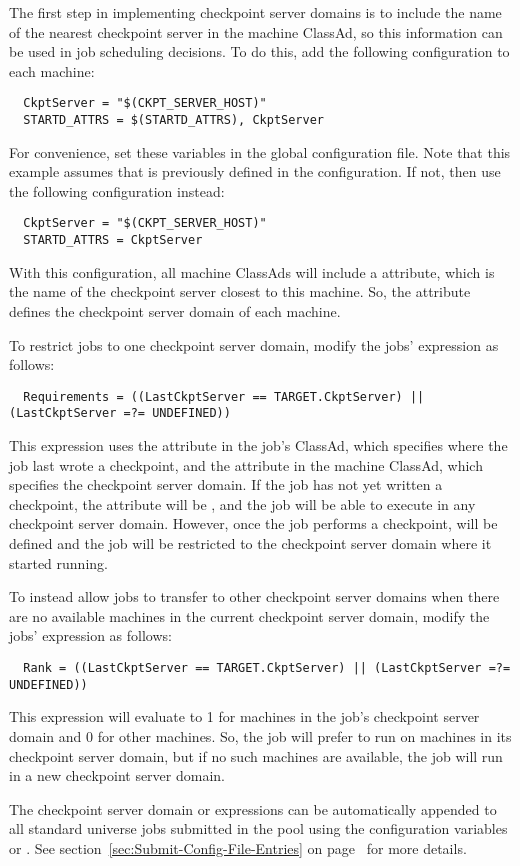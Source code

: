 The first step in implementing checkpoint server domains is to include
the name of the nearest checkpoint server in the machine
ClassAd, so this information can be used in job scheduling decisions.
To do this, add the following configuration to each machine:
\begin{verbatim}
  CkptServer = "$(CKPT_SERVER_HOST)"
  STARTD_ATTRS = $(STARTD_ATTRS), CkptServer
\end{verbatim}
For convenience, set these variables in the global configuration file.
Note that this example assumes that
 is previously defined in the configuration.
If not, then use the following configuration instead:
\begin{verbatim}
  CkptServer = "$(CKPT_SERVER_HOST)"
  STARTD_ATTRS = CkptServer
\end{verbatim}
With this configuration, all machine ClassAds will include a 
attribute, which is the name of the checkpoint server closest to this
machine.  So, the  attribute defines the checkpoint
server domain of each machine.

To restrict jobs to one checkpoint server domain,
modify the jobs'  expression as follows:
\footnotesize
\begin{verbatim}
  Requirements = ((LastCkptServer == TARGET.CkptServer) || (LastCkptServer =?= UNDEFINED))
\end{verbatim}
\normalsize
This  expression uses the 
attribute in the job's ClassAd, which specifies where the job last
wrote a checkpoint, and the  attribute in the
machine ClassAd, which specifies the checkpoint server domain.  If the
job has not yet written a checkpoint, the 
attribute will be , and the job will be able to execute in
any checkpoint server domain.  However, once the job performs a
checkpoint,
 will be defined and the job will be restricted to the
checkpoint server domain where it started running.

To instead allow jobs to transfer to other checkpoint
server domains when there are no available machines in the current
checkpoint server domain, modify the jobs'  expression
as follows:
\footnotesize
\begin{verbatim}
  Rank = ((LastCkptServer == TARGET.CkptServer) || (LastCkptServer =?= UNDEFINED))
\end{verbatim}
\normalsize
This  expression will evaluate to 1 for machines in the
job's checkpoint server domain and 0 for other machines.  So, the job
will prefer to run on machines in its checkpoint server domain, but if
no such machines are available, the job will run in a new checkpoint
server domain.

The checkpoint server domain  or  expressions 
can be automatically appended 
to all standard universe jobs submitted in the pool using
the configuration variables
 or .
See section~\ref{sec:Submit-Config-File-Entries} on
page~\pageref{sec:Submit-Config-File-Entries} for more details.
